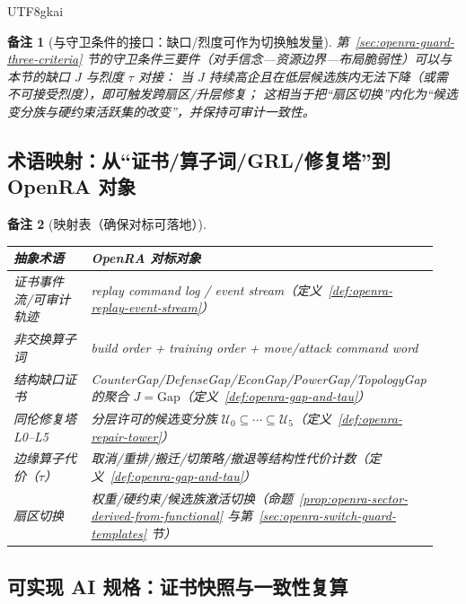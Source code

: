 \documentclass[12pt]{article}
\newtheorem{remark}{备注}[section]
\begin{document}
\begin{CJK*}{UTF8}{gkai}
\begin{remark}[与守卫条件的接口：缺口/烈度可作为切换触发量]
第~\ref{sec:openra-guard-three-criteria} 节的守卫条件三要件（对手信念—资源边界—布局脆弱性）可以与本节的缺口 $J$ 与烈度 $\tau$ 对接：
当 $J$ 持续高企且在低层候选族内无法下降（或需不可接受烈度），即可触发跨扇区/升层修复；
这相当于把“扇区切换”内化为“候选变分族与硬约束活跃集的改变”，并保持可审计一致性。
\end{remark}

\subsection{术语映射：从“证书/算子词/GRL/修复塔”到 OpenRA 对象}
\label{sec:openra-generating-functional-terminology}

\begin{remark}[映射表（确保对标可落地）]
\begin{center}
\begin{tabular}{p{0.38\linewidth} p{0.56\linewidth}}
\hline
抽象术语 & OpenRA 对标对象 \\
\hline
证书事件流/可审计轨迹 & replay command log / event stream（定义~\ref{def:openra-replay-event-stream}） \\
非交换算子词 & build order + training order + move/attack command word \\
结构缺口证书 & CounterGap/\allowbreak DefenseGap/\allowbreak EconGap/\allowbreak PowerGap/\allowbreak TopologyGap 的聚合\newline
  $J=\mathrm{Gap}$（定义~\ref{def:openra-gap-and-tau}） \\
同伦修复塔 L0--L5 & 分层许可的候选变分族 $\mathcal{U}_0\subseteq\cdots\subseteq\mathcal{U}_5$\newline （定义~\ref{def:openra-repair-tower}）
  \\
边缘算子代价（$\tau$） & 取消/重排/搬迁/切策略/撤退等结构性代价计数（定义~\ref{def:openra-gap-and-tau}） \\
扇区切换 & 权重/硬约束/候选族激活切换（命题~\ref{prop:openra-sector-derived-from-functional} 与第~\ref{sec:openra-switch-guard-templates} 节）
  \\
\hline
\end{tabular}
\end{center}
\end{remark}

\subsection{可实现 AI 规格：证书快照与一致性复算}
\label{sec:openra-mvp-certificate-snapshot}


\end{CJK*}
\end{document}
